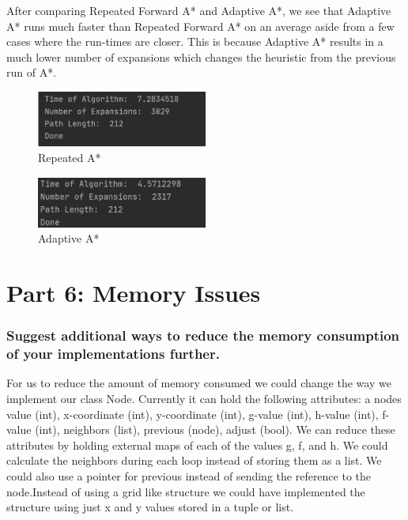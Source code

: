 \documentclass{article}
\begin{document}
\setcounter{figure}{0}


After comparing Repeated Forward A* and Adaptive A*, we see that Adaptive A* runs much faster than Repeated Forward A* on an average aside from a few cases where the run-times are closer. This is because Adaptive A* results in a much lower number of expansions which changes the heuristic from the previous run of A*.
\newline



\begin{figure}[h!]
  
  \centering
  \includegraphics[width=0.5\textwidth]{repforwardstats.png}
  \caption{Repeated A*}
\end{figure}

\begin{figure}[h!]
  
  \centering
  \includegraphics[width=0.5\textwidth]{adaptivestats.png}
  \caption{Adaptive A*}
\end{figure}


\section*{Part 6: Memory Issues}
\subsubsection*{Suggest additional ways to reduce the memory consumption of your implementations further.}
For us to reduce the amount of memory consumed we could change the way we implement our class Node. Currently it can hold the following attributes:  a nodes value (int), x-coordinate (int), y-coordinate (int), g-value (int), h-value (int), f-value (int), neighbors (list),  previous (node), adjust (bool). We can reduce these attributes by holding external maps of each of the values g, f, and h. We could calculate the neighbors during each loop instead of storing them as a list. We could also use a pointer for previous instead of sending the reference to the node.Instead of using a grid like structure we could have implemented the structure using just x and y values stored in a tuple or list.
\end{document}
